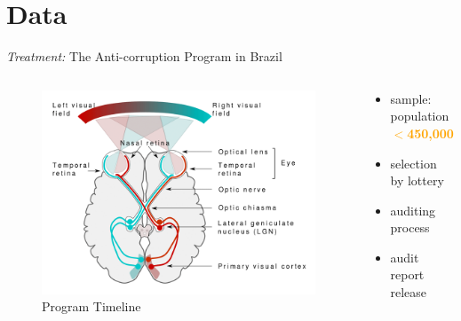 \section{Data}
    
    \frame{\sectionpage}
    
    \begin{frame}{\textit{Treatment:} The Anti-corruption Program in Brazil}
    
    \begin{columns}

    \begin{column}{0.5\textwidth}
        \begin{figure}\label{fig1}
        \centering
        \includegraphics[height = 0.65 \textheight]{images/fig1.png}
        \caption{Program Timeline}
        \end{figure}
    \end{column}
    
    \begin{column}{0.4\textwidth}
    
    \begin{itemize}
      	\item<2-> sample: population \textbf<3->{\textcolor<3->{orange}{$<$450,000}}
      	\item<5-> selection by lottery
      	\item<6-> auditing process
      	\item<8-> audit report release
      \end{itemize}
    
    

\end{column}
\end{columns}
\end{frame}
